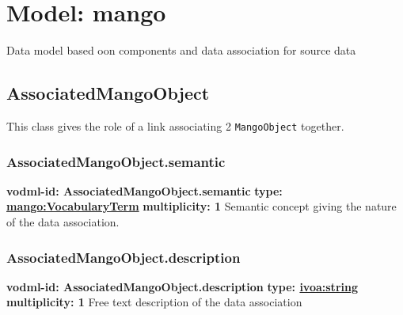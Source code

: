 
%



    
    
    
    
    
    
      

\pagebreak
\section{Model: mango }
  

  Data model based oon components and data association for source data

  \subsection{AssociatedMangoObject}
  \label{sect:AssociatedMangoObject}
    This class gives the role of a link associating 2 \texttt{MangoObject} together.

    \subsubsection{AssociatedMangoObject.semantic}
      \textbf{vodml-id: AssociatedMangoObject.semantic} \newline
      \textbf{type: \hyperref[sect:VocabularyTerm]{mango:VocabularyTerm}} \newline
      \textbf{multiplicity: 1} \newline 
      Semantic concept giving the nature of the data association.

    \subsubsection{AssociatedMangoObject.description}
      \textbf{vodml-id: AssociatedMangoObject.description} \newline
      \textbf{type: \hyperref[sect:ivoa]{ivoa:string}} \newline
      \textbf{multiplicity: 1} \newline 
      Free text description of the data association


